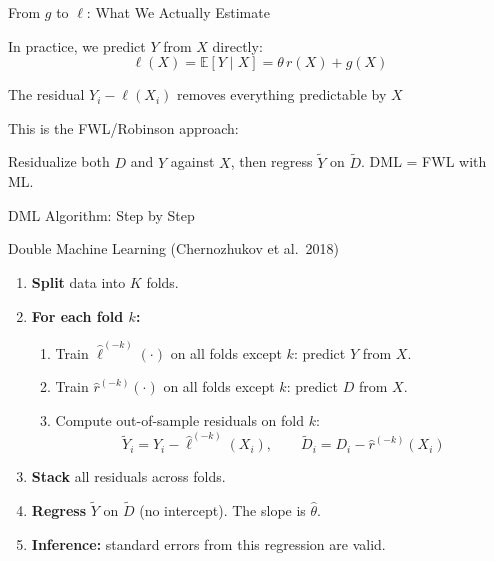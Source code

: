 \documentclass[aspectratio=169, 11pt, handout]{beamer}
\newcommand{\E}{\mathbb{E}}
\begin{document}
\begin{frame}{From $g$ to $\ell$: What We Actually Estimate}

In practice, we predict $Y$ from $X$ directly:
\[
\ell(X) = \E[Y \mid X] = \theta\, r(X) + g(X)
\]

The residual $Y_i - \ell(X_i)$ removes everything predictable by $X$

\bigskip
\pause

This is the FWL/Robinson approach:

\begin{center}
\end{center}

Residualize both $D$ and $Y$ against $X$, then regress $\tilde{Y}$ on $\tilde{D}$. DML = FWL with ML.

\end{frame}


\begin{frame}{DML Algorithm: Step by Step}

\begin{block}{Double Machine Learning (Chernozhukov et al.\ 2018)}
\begin{enumerate}
    \item \textbf{Split} data into $K$ folds.
    \item \textbf{For each fold $k$:}
    \begin{enumerate}
        \item[(a)] Train $\hat{\ell}^{(-k)}(\cdot)$ on all folds except $k$: predict $Y$ from $X$.
        \item[(b)] Train $\hat{r}^{(-k)}(\cdot)$ on all folds except $k$: predict $D$ from $X$.
        \item[(c)] Compute out-of-sample residuals on fold $k$:
        \[
        \tilde{Y}_i = Y_i - \hat{\ell}^{(-k)}(X_i), \qquad \tilde{D}_i = D_i - \hat{r}^{(-k)}(X_i)
        \]
    \end{enumerate}
    \item \textbf{Stack} all residuals across folds.
    \item \textbf{Regress} $\tilde{Y}$ on $\tilde{D}$ (no intercept). The slope is $\hat{\theta}$.
    \item \textbf{Inference:} standard errors from this regression are valid.
\end{enumerate}
\end{block}

\end{frame}
\end{document}
